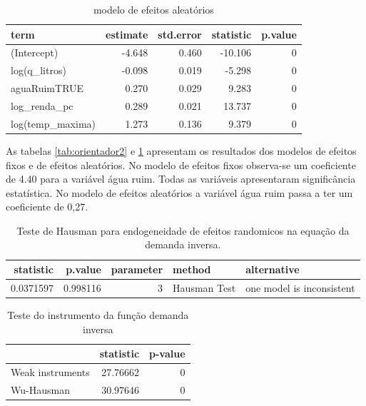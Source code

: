 \documentclass[
  12pt,
]{book}
\begin{document}
\begin{table}

\caption{\label{tab:orientador4}modelo de efeitos aleatórios}
\centering
\begin{tabular}[t]{l|r|r|r|r}
\hline
term & estimate & std.error & statistic & p.value\\
\hline
(Intercept) & -4.648 & 0.460 & -10.106 & 0\\
\hline
log(q\_litros) & -0.098 & 0.019 & -5.298 & 0\\
\hline
aguaRuimTRUE & 0.270 & 0.029 & 9.283 & 0\\
\hline
log\_renda\_pc & 0.289 & 0.021 & 13.737 & 0\\
\hline
log(temp\_maxima) & 1.273 & 0.136 & 9.379 & 0\\
\hline
\end{tabular}
\end{table}

As tabelas \ref{tab:orientador2} e \ref{tab:orientador4} apresentam os resultados dos modelos de efeitos fixos e de efeitos aleatórios. No modelo de efeitos fixos observa-se um coeficiente de 4.40 para a variável água ruim. Todas as variáveis apresentaram significância estatística. No modelo de efeitos aleatórios a variável água ruim passa a ter um coeficiente de 0,27.

\begin{table}

\caption{\label{tab:orientador5}Teste de Hausman para endogeneidade de efeitos randomicos na equação da demanda inversa.}
\centering
\begin{tabular}[t]{r|r|r|l|l}
\hline
statistic & p.value & parameter & method & alternative\\
\hline
0.0371597 & 0.998116 & 3 & Hausman Test & one model is inconsistent\\
\hline
\end{tabular}
\end{table}

\begin{table}

\caption{\label{tab:testinstrument1}Teste do instrumento da função demanda inversa}
\centering
\begin{tabular}[t]{l|r|r}
\hline
  & statistic & p-value\\
\hline
Weak instruments & 27.76662 & 0\\
\hline
Wu-Hausman & 30.97646 & 0\\
\hline
\end{tabular}
\end{table}
\end{document}
